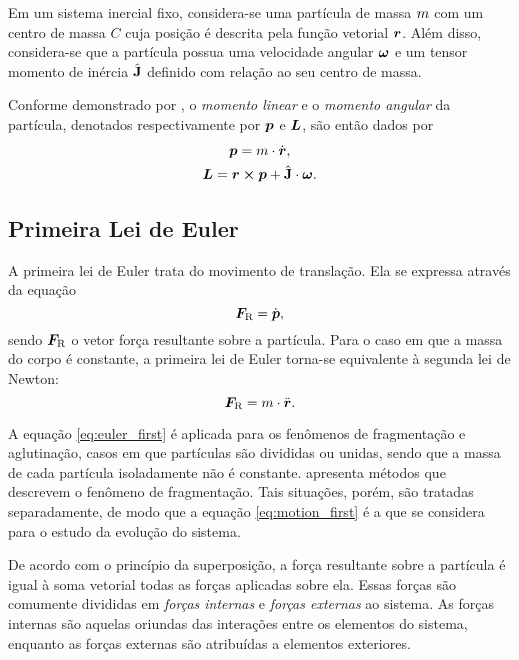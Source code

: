 Em um sistema inercial fixo, considera-se uma partícula de massa \(m\) com um centro de massa \(C\) cuja posição é descrita pela função vetorial \(\bm{r}\). Além disso, considera-se que a partícula possua uma velocidade angular \(\bm{\omega}\) e um tensor momento de inércia \(\hat{\mathbf{J}}\) definido com relação ao seu centro de massa.

Conforme demonstrado por , o \textit{momento linear} e o \textit{momento angular} da partícula, denotados respectivamente por \(\bm{p}\) e \(\bm{L}\), são então dados por
\begin{gather*}
	\linearMomentum = \mass\cdot\velocity, \\
	\angularMomentum = \position\cross\linearMomentum + \tensorOfInertia\cdot\angularVelocity.
\end{gather*}

\subsection{Primeira Lei de Euler}

A primeira lei de Euler trata do movimento de translação. Ela se expressa através da equação
\begin{equation} \label{eq:euler_first}
	\resultingForce = \deriv{1}{\linearMomentum},
\end{equation}
sendo \(\bm{F}_{\text{R}}\) o vetor força resultante sobre a partícula. Para o caso em que a massa do corpo é constante, a primeira lei de Euler torna-se equivalente à segunda lei de Newton:
\begin{equation} \label{eq:motion_first}
	\resultingForce = \mass\cdot\acceleration.
\end{equation}

A equação \eqref{eq:euler_first} é aplicada para os fenômenos de fragmentação e aglutinação, casos em que partículas são divididas ou unidas, sendo que a massa de cada partícula isoladamente não é constante.  apresenta métodos que descrevem o fenômeno de fragmentação. Tais situações, porém, são tratadas separadamente, de modo que a equação \eqref{eq:motion_first} é a que se considera para o estudo da evolução do sistema.

De acordo com o princípio da superposição, a força resultante sobre a partícula é igual à soma vetorial todas as forças aplicadas sobre ela. Essas forças são comumente divididas em \textit{forças internas} e \textit{forças externas} ao sistema. As forças internas são aquelas oriundas das interações entre os elementos do sistema, enquanto as forças externas são atribuídas a elementos exteriores.

